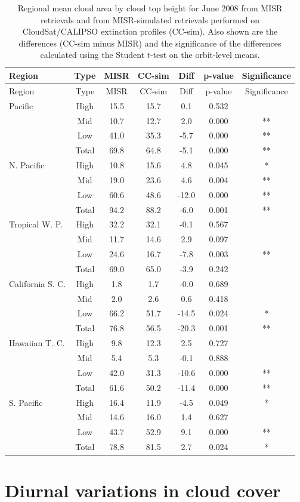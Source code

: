 \begin{longtable}[]{@{}lcccccc@{}}
\caption{\label{tbl:misr_cldmisr_table_june}Regional mean cloud area by
cloud top height for June 2008 from MISR retrievals and from
MISR-simulated retrievals performed on CloudSat/CALIPSO extinction
profiles (CC-sim). Also shown are the differences (CC-sim minus MISR)
and the significance of the differences calculated using the Student
\(t\)-test on the orbit-level means. }\tabularnewline
\toprule
Region & Type & MISR & CC-sim & Diff & p-value &
Significance\tabularnewline
\midrule
\endfirsthead
\toprule
Region & Type & MISR & CC-sim & Diff & p-value &
Significance\tabularnewline
\midrule
\endhead
Pacific & High & 15.5 & 15.7 & 0.1 & 0.532 &\tabularnewline
& Mid & 10.7 & 12.7 & 2.0 & 0.000 & **\tabularnewline
& Low & 41.0 & 35.3 & -5.7 & 0.000 & **\tabularnewline
& Total & 69.8 & 64.8 & -5.1 & 0.000 & **\tabularnewline
N. Pacific & High & 10.8 & 15.6 & 4.8 & 0.045 & *\tabularnewline
& Mid & 19.0 & 23.6 & 4.6 & 0.004 & **\tabularnewline
& Low & 60.6 & 48.6 & -12.0 & 0.000 & **\tabularnewline
& Total & 94.2 & 88.2 & -6.0 & 0.001 & **\tabularnewline
Tropical W. P. & High & 32.2 & 32.1 & -0.1 & 0.567 &\tabularnewline
& Mid & 11.7 & 14.6 & 2.9 & 0.097 &\tabularnewline
& Low & 24.6 & 16.7 & -7.8 & 0.003 & **\tabularnewline
& Total & 69.0 & 65.0 & -3.9 & 0.242 &\tabularnewline
California S. C. & High & 1.8 & 1.7 & -0.0 & 0.689 &\tabularnewline
& Mid & 2.0 & 2.6 & 0.6 & 0.418 &\tabularnewline
& Low & 66.2 & 51.7 & -14.5 & 0.024 & *\tabularnewline
& Total & 76.8 & 56.5 & -20.3 & 0.001 & **\tabularnewline
Hawaiian T. C. & High & 9.8 & 12.3 & 2.5 & 0.727 &\tabularnewline
& Mid & 5.4 & 5.3 & -0.1 & 0.888 &\tabularnewline
& Low & 42.0 & 31.3 & -10.6 & 0.000 & **\tabularnewline
& Total & 61.6 & 50.2 & -11.4 & 0.000 & **\tabularnewline
S. Pacific & High & 16.4 & 11.9 & -4.5 & 0.049 & *\tabularnewline
& Mid & 14.6 & 16.0 & 1.4 & 0.627 &\tabularnewline
& Low & 43.7 & 52.9 & 9.1 & 0.000 & **\tabularnewline
& Total & 78.8 & 81.5 & 2.7 & 0.024 & *\tabularnewline
\bottomrule
\end{longtable}

\section{Diurnal variations in cloud cover}\label{sec:misrDiurnal}

